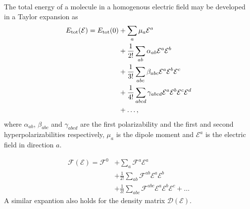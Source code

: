 \documentclass[prl,aps,twocolumn,showpacs,twocolumngrid,superbib]{revtex4}
\def\F{\mathcal{F}}
\def\D{\mathcal{D}}
\def\E{\mathcal{E}}
\begin{document}
The total energy of a molecule in a homogenous electric field may 
be developed in a Taylor expansion as
\begin{equation}
  \begin{split}
    E_{\rm tot}(\E)= E_{\rm tot}(0) & +\sum_a\mu_a\E^a\\
    &+\frac{1}{2!}\sum_{ab}\alpha_{ab}\E^a\E^b\\
    &+\frac{1}{3!}\sum_{abc}\beta_{abc}\E^a\E^b\E^c\\
    &+\frac{1}{4!}\sum_{abcd}\gamma_{abcd}\E^a\E^b\E^c\E^d\\
    &+\dots,
  \end{split}
\end{equation}
 where $\alpha_{ab}$, $\beta_{abc}$ and $\gamma_{abcd}$ are 
 the first polarizability and the first and second 
 hyperpolarizabilities respectively, $\mu_a$ is the dipole 
 moment and $\E^a$ is the electric field in direction $a$. 

\begin{equation}
  \begin{split}
    \F(\E)=\F^{0} & +\sum_a \F^{a}\E^{a}\\
    &+\frac{1}{2!}\sum_{ab} \F^{ab}\E^{a}\E^{b}\\
    &+\frac{1}{3!}\sum_{abc} \F^{abc}\E^{a}\E^{b}\E^{c}+\dots
  \end{split}
\end{equation}
A similar expantion also holds for the density matrix $\D(\E)$.
\end{document}
